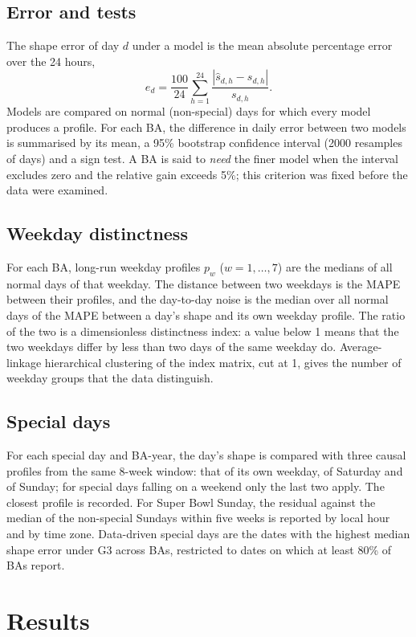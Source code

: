 \documentclass[conference]{IEEEtran}
\begin{document}
\subsection{Error and tests}
The shape error of day $d$ under a model is the mean absolute percentage error over the 24 hours,
\begin{equation}
e_d = \frac{100}{24}\sum_{h=1}^{24}\frac{|\hat{s}_{d,h} - s_{d,h}|}{s_{d,h}} .
\end{equation}
Models are compared on normal (non-special) days for which every model produces a profile. For each BA, the difference in daily error between two models is summarised by its mean, a 95\% bootstrap confidence interval (2000 resamples of days) and a sign test. A BA is said to \emph{need} the finer model when the interval excludes zero and the relative gain exceeds 5\%; this criterion was fixed before the data were examined.

\subsection{Weekday distinctness}
For each BA, long-run weekday profiles $p_w$ ($w = 1,\dots,7$) are the medians of all normal days of that weekday. The distance between two weekdays is the MAPE between their profiles, and the day-to-day noise is the median over all normal days of the MAPE between a day's shape and its own weekday profile. The ratio of the two is a dimensionless distinctness index: a value below 1 means that the two weekdays differ by less than two days of the same weekday do. Average-linkage hierarchical clustering of the index matrix, cut at 1, gives the number of weekday groups that the data distinguish.

\subsection{Special days}
For each special day and BA-year, the day's shape is compared with three causal profiles from the same 8-week window: that of its own weekday, of Saturday and of Sunday; for special days falling on a weekend only the last two apply. The closest profile is recorded. For Super Bowl Sunday, the residual against the median of the non-special Sundays within five weeks is reported by local hour and by time zone. Data-driven special days are the dates with the highest median shape error under G3 across BAs, restricted to dates on which at least 80\% of BAs report.

\section{Results}
\end{document}
